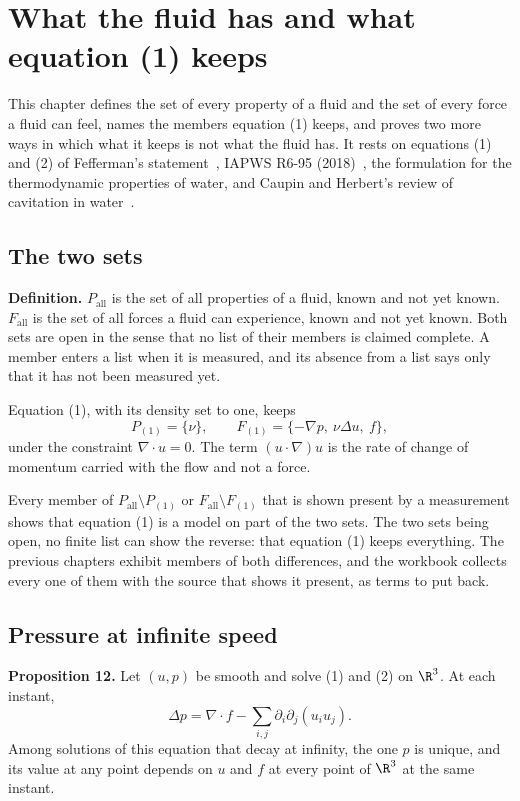 \chapter{What the fluid has and what equation (1) keeps}

This chapter defines the set of every property of a fluid and the set of every force a fluid can
feel, names the members equation (1) keeps, and proves two more ways in which what it keeps is not
what the fluid has. It rests on equations (1) and (2) of Fefferman's
statement~\cite{src:Fefferman}, IAPWS R6-95 (2018)~\cite{src:IAPWS-R6-95-2018}, the formulation
for the thermodynamic properties of water, and Caupin and Herbert's review of cavitation in
water~\cite{src:Caupin-and-Herbert-2006}.

\section{The two sets}

\textbf{Definition.} $P_{\mathrm{all}}$ is the set of all properties of a fluid, known and not yet
known. $F_{\mathrm{all}}$ is the set of all forces a fluid can experience, known and not yet known.
Both sets are open in the sense that no list of their members is claimed complete. A member enters
a list when it is measured, and its absence from a list says only that it has not been measured
yet.

Equation (1), with its density set to one, keeps
\[
P_{(1)} = \{\nu\},
\qquad
F_{(1)} = \{-\nabla p,\ \nu\Delta u,\ f\},
\]
under the constraint $\nabla\cdot u = 0$. The term $(u\cdot\nabla)u$ is the rate of change of
momentum carried with the flow and not a force.

Every member of $P_{\mathrm{all}}\setminus P_{(1)}$ or $F_{\mathrm{all}}\setminus F_{(1)}$ that is
shown present by a measurement shows that equation (1) is a model on part of the two sets. The two sets being
open, no finite list can show the reverse: that equation (1) keeps everything. The previous chapters
exhibit members of both differences, and the workbook collects every one of them with the source
that shows it present, as terms to put back.

\section{Pressure at infinite speed}

\textbf{Proposition 12.} Let $(u,p)$ be smooth and solve (1) and (2) on $\R^3$. At each instant,
\[
\Delta p = \nabla\cdot f - \sum_{i,j}\partial_i\partial_j(u_iu_j).
\]
Among solutions of this equation that decay at infinity, the one $p$ is unique, and its value at
any point depends on $u$ and $f$ at every point of $\R^3$ at the same instant.

